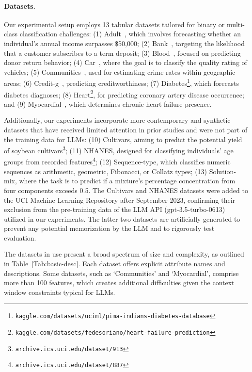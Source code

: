 \paragraph{Datasets.}
Our experimental setup employs 13 tabular datasets tailored for binary or multi-class classification challenges: (1) Adult~\cite{asuncion2007uci}, which involves forecasting whether an individual's annual income surpasses \$50,000; (2) Bank~\cite{moro2014data}, targeting the likelihood that a customer subscribes to a term deposit; (3) Blood~\cite{yeh2009knowledge}, focused on predicting donor return behavior; (4) Car~\cite{kadra2021well}, where the goal is to classify the quality rating of vehicles; (5) Communities~\cite{misc_communities_and_crime_183}, used for estimating crime rates within geographic areas; (6) Credit-g~\cite{kadra2021well}, predicting creditworthiness; (7) Diabetes\footnote{\texttt{kaggle.com/datasets/uciml/pima-indians-diabetes-database}}, which forecasts diabetes diagnoses; (8) Heart\footnote{\texttt{kaggle.com/datasets/fedesoriano/heart-failure-prediction}}, for predicting coronary artery disease occurrence; and (9) Myocardial~\cite{misc_myocardial_infarction_complications_579}, which determines chronic heart failure presence.

Additionally, our experiments incorporate more contemporary and synthetic datasets that have received limited attention in prior studies and were not part of the training data for LLMs: (10) Cultivars, aiming to predict the potential yield of soybean cultivars\footnote{\texttt{archive.ics.uci.edu/dataset/913}}; (11) NHANES, designed for classifying individuals' age groups from recorded features\footnote{\texttt{archive.ics.uci.edu/dataset/887}}; (12) Sequence-type, which classifies numeric sequences as arithmetic, geometric, Fibonacci, or Collatz types; (13) Solution-mix, where the task is to predict if a mixture's percentage concentration from four components exceeds 0.5. The Cultivars and NHANES datasets were added to the UCI Machine Learning Repository after September 2023, confirming their exclusion from the pre-training data of the LLM API (gpt-3.5-turbo-0613) utilized in our experiments. The latter two datasets are artificially generated to prevent any potential memorization by the LLM and to rigorously test evaluation.

The datasets in use present a broad spectrum of size and complexity, as outlined in Table~\ref{Tab:basic-desc}. Each dataset offers explicit attribute names and descriptions. Some datasets, such as `Communities' and `Myocardial', comprise more than 100 features, which creates additional difficulties given the context window constraints typical for LLMs.

